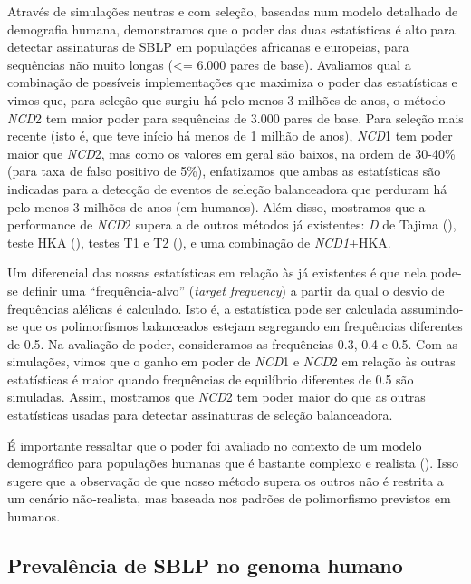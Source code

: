 \begin{refsection}
Através de simulações neutras e com seleção, baseadas num modelo detalhado de demografia humana, demonstramos que o poder das duas estatísticas é alto para detectar assinaturas de SBLP em populações africanas e europeias, para sequências não muito longas (<= 6.000 pares de base). Avaliamos qual a combinação de possíveis implementações que maximiza o poder das estatísticas e vimos que, para seleção que surgiu há pelo menos 3 milhões de anos, o método \emph{NCD}2 tem maior poder para sequências de 3.000 pares de base. Para seleção mais recente (isto é, que teve início há menos de 1 milhão de anos), \emph{NCD}1 tem poder maior que \emph{NCD}2, mas como os valores em geral são baixos, na ordem de 30-40\% (para taxa de falso positivo de 5\%), enfatizamos que ambas as estatísticas são indicadas para a detecção de eventos de seleção balanceadora que perduram há pelo menos 3 milhões de anos (em humanos). Além disso, mostramos que a performance de \emph{NCD}2 supera a de outros métodos já existentes: \emph{D} de Tajima (\cite{tajima1989statistical}), teste HKA (\cite{Hudson1987}), testes T1 e T2 (\cite{DeGiorgio2014}), e uma combinação de \emph{NCD1}+HKA.

Um diferencial das nossas estatísticas em relação às já existentes é que nela pode-se definir uma \enquote{frequência-alvo} (\emph{target frequency}) a partir da qual o desvio de frequências alélicas é calculado. Isto é, a estatística pode ser calculada assumindo-se que os polimorfismos balanceados estejam segregando em frequências diferentes de 0.5. Na avaliação de poder, consideramos as frequências 0.3, 0.4 e 0.5. Com as simulações, vimos que o ganho em poder de \emph{NCD}1 e \emph{NCD}2 em relação às outras estatísticas é maior quando frequências de equilíbrio diferentes de 0.5 são simuladas. Assim, mostramos que \emph{NCD}2 tem poder maior do que as outras estatísticas usadas para detectar assinaturas de seleção balanceadora. 

É importante ressaltar que o poder foi avaliado no contexto de um modelo demográfico para populações humanas que é bastante complexo e realista (\cite{Gravel2011}). Isso sugere que a observação de que nosso método supera os outros não é restrita a um cenário não-realista, mas baseada nos padrões de polimorfismo previstos em humanos.

\subsection{Prevalência de SBLP no genoma humano}



\end{refsection}
